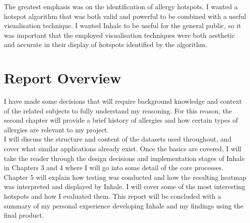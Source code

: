 The greatest emphasis was on the identification of allergy hotspots. I wanted a hotspot algorithm that was both valid and powerful to be combined with a useful visualisation technique. I wanted Inhale to be useful for the general public, so it was important that the employed visualisation techniques were both aesthetic and accurate in their display of hotspots identified by the algorithm.\\


\section{Report Overview}
I have made some decisions that will require background knowledge and context of the related subjects to fully understand my reasoning. For this reason, the second chapter will provide a brief history of allergies and how certain types of allergies are relevant to my project.\\

I will discuss the structure and content of the datasets used throughout, and cover what similar applications already exist. Once the basics are covered, I will take the reader through the design decisions and implementation stages of Inhale in Chapters 3 and 4 where I will go into some detail of the core processes.\\

Chapter 5 will explain how testing was conducted and how the resulting heatmap was interpreted and displayed by Inhale. I will cover some of the most interesting hotspots and how I evaluated them. This report will be concluded with a summary of my personal experience developing Inhale and my findings using the final product.\\